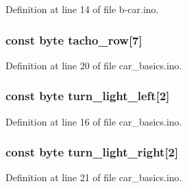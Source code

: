 Definition at line 14 of file b-\/car.\+ino.

\subsubsection[{\texorpdfstring{tacho\+\_\+row}{tacho_row}}]{\setlength{\rightskip}{0pt plus 5cm}const byte tacho\+\_\+row\mbox{[}7\mbox{]}}\hypertarget{group__deployment_gae646a1734cc95ba36b0998697da68878}{}\label{group__deployment_gae646a1734cc95ba36b0998697da68878}


Definition at line 20 of file car\+\_\+basics.\+ino.

\subsubsection[{\texorpdfstring{turn\+\_\+light\+\_\+left}{turn_light_left}}]{\setlength{\rightskip}{0pt plus 5cm}const byte turn\+\_\+light\+\_\+left\mbox{[}2\mbox{]}}\hypertarget{group__deployment_gaa66783b35924c2be3ec318934f0d479f}{}\label{group__deployment_gaa66783b35924c2be3ec318934f0d479f}


Definition at line 16 of file car\+\_\+basics.\+ino.

\subsubsection[{\texorpdfstring{turn\+\_\+light\+\_\+right}{turn_light_right}}]{\setlength{\rightskip}{0pt plus 5cm}const byte turn\+\_\+light\+\_\+right\mbox{[}2\mbox{]}}\hypertarget{group__deployment_ga2c04f83f019c3bf8feeaae688dbbc164}{}\label{group__deployment_ga2c04f83f019c3bf8feeaae688dbbc164}


Definition at line 21 of file car\+\_\+basics.\+ino.

